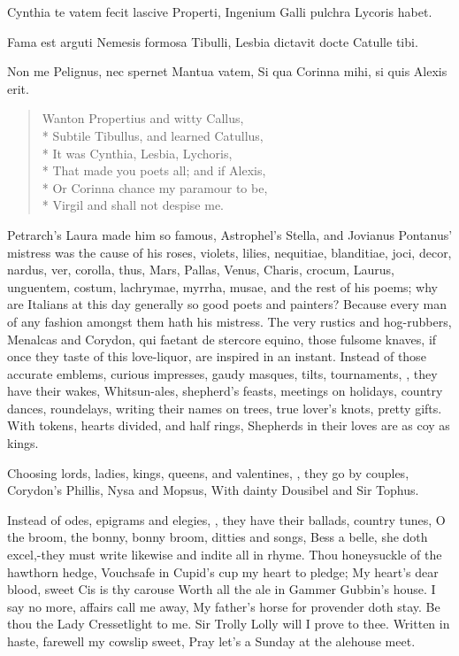 Cynthia te vatem fecit lascive Properti,
Ingenium Galli pulchra Lycoris habet.

Fama est arguti Nemesis formosa Tibulli,
Lesbia dictavit docte Catulle tibi.

Non me Pelignus, nec spernet Mantua vatem,
Si qua Corinna mihi, si quis Alexis erit.


\begin{verse}
Wanton Propertius and witty Callus,\\*
Subtile Tibullus, and learned Catullus,\\*
It was Cynthia, Lesbia, Lychoris,\\*
That made you poets all; and if Alexis,\\*
Or Corinna chance my paramour to be,\\*
Virgil and \Ovid shall not despise me.
\end{verse}


Petrarch's Laura made him so famous, Astrophel's Stella, and Jovianus
Pontanus' mistress was the cause of his roses, violets, lilies,
nequitiae, blanditiae, joci, decor, nardus, ver, corolla, thus, Mars,
Pallas, Venus, Charis, crocum, Laurus, unguentem, costum, lachrymae,
myrrha, musae, \etc{} and the rest of his poems; why are Italians at this
day generally so good poets and painters? Because every man of any
fashion amongst them hath his mistress. The very rustics and
hog-rubbers, Menalcas and Corydon, qui faetant de stercore equino,
those fulsome knaves, if once they taste of this love-liquor, are
inspired in an instant. Instead of those accurate emblems, curious
impresses, gaudy masques, tilts, tournaments, \etc{}, they have their
wakes, Whitsun-ales, shepherd's feasts, meetings on holidays, country
dances, roundelays, writing their names on trees, true lover's
knots, pretty gifts.
With tokens, hearts divided, and half rings,
Shepherds in their loves are as coy as kings.

Choosing lords, ladies, kings, queens, and valentines, \etc{}, they go by
couples,
Corydon's Phillis, Nysa and Mopsus,
With dainty Dousibel and Sir Tophus.

Instead of odes, epigrams and elegies, \etc{}, they have their ballads,
country tunes, O the broom, the bonny, bonny broom, ditties and songs,
Bess a belle, she doth excel,-they must write likewise and indite all
in rhyme.
Thou honeysuckle of the hawthorn hedge,
Vouchsafe in Cupid's cup my heart to pledge;
My heart's dear blood, sweet Cis is thy carouse
Worth all the ale in Gammer Gubbin's house.
I say no more, affairs call me away,
My father's horse for provender doth stay.
Be thou the Lady Cressetlight to me.
Sir Trolly Lolly will I prove to thee.
Written in haste, farewell my cowslip sweet,
Pray let's a Sunday at the alehouse meet.

